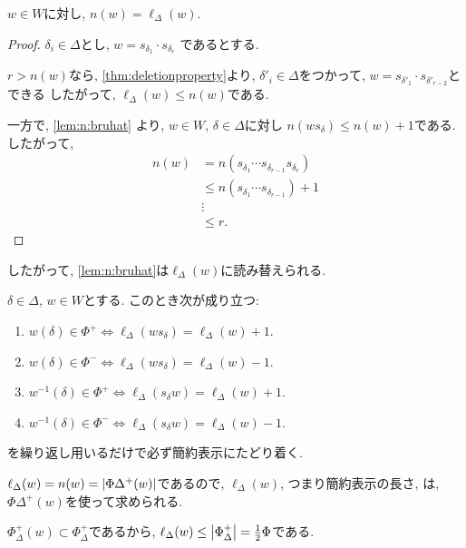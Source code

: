 \begin{cor}
  \label{prop:n=l}
  $w\in W$に対し, $n(w)=\ell_\Delta(w)$.
\end{cor}
\begin{proof}
  $\delta_i\in\Delta$とし,
  $w=s_{\delta_1}\cdot s_{\delta_r}$
  であるとする.

  $r>n(w)$なら,
  \cref{thm:deletionproperty}より,  
  $\delta'_i\in\Delta$をつかって,
  $w=s_{\delta'_1}\cdot s_{\delta'_{r-2}}$とできる
  したがって, $\ell_\Delta(w) \leq n(w)$である.

  一方で,
  \cref{lem:n:bruhat}
  より,
  $w\in W$, $\delta\in \Delta$に対し
  $n(ws_\delta)\leq n(w)+1$である.
  したがって,
  \begin{align*}
    n(w)&=n(s_{\delta_1}\cdots s_{\delta_{r-1}}s_{\delta_r})\\
    &\leq n(s_{\delta_1}\cdots s_{\delta_{r-1}})+1\\
    &\vdots\\
    &\leq r.
  \end{align*}
  
\end{proof}


したがって, \cref{lem:n:bruhat}は$\ell_\Delta(w)$に読み替えられる.
\begin{theorem}
  \label{thm:l:bruhat}
  $\delta\in\Delta$, $w\in W$とする.
  このとき次が成り立つ:
  \begin{enumerate}
  \item
    $w(\delta)\in\Phi^+ \iff \ell_\Delta(ws_\delta)=\ell_\Delta(w)+1$.
  \item $w(\delta)\in\Phi^- \iff \ell_\Delta(ws_\delta)=\ell_\Delta(w)-1$.
  \item
    $w^{-1}(\delta)\in\Phi^+ \iff \ell_\Delta(s_\delta w)=\ell_\Delta(w)+1$.
  \item
    $w^{-1}(\delta)\in\Phi^- \iff \ell_\Delta(s_\delta w)=\ell_\Delta(w)-1$.
  \end{enumerate}
\end{theorem}

\begin{remark}
  を繰り返し用いるだけで必ず簡約表示にたどり着く.
\end{remark}

\begin{remark}
  $\ell_\Delta(w)=n(w)=\left|\Phi\Delta^+(w)\right|$であるので,
  $\ell_\Delta(w)$, つまり簡約表示の長さ, は,
  $\Phi\Delta^+(w)$を使って求められる.

  $\Phi_\Delta^+(w)\subset \Phi_\Delta^+$であるから,
  $\ell_\Delta(w)\leq \left|\Phi_\Delta^+\right|=\frac{1}{2}\Phi$である.
\end{remark}

